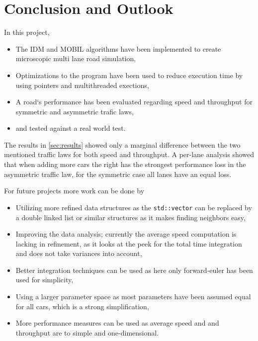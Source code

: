 \section{Conclusion and Outlook}
\label{sec:conclusion}
In this project, 
\begin{itemize}
  \item The IDM and MOBIL algorithms have been implemented to create microscopic multi lane road
    simulation,
  \item Optimizations to the program have been used to reduce execution time by using pointers and
    multithreaded exections,
  \item A road`s performance has been evaluated regarding speed and throughput for symmetric and
    asymmetric trafic laws,
  \item and tested against a real world test.
\end{itemize}
The results in \autoref{sec:results} showed only a marginal difference between the two mentioned
traffic laws for both speed and throughput. A per-lane analysis showed that when adding more cars
the right has the strongest performance loss in the asymmetric traffic law, for the symmetric case
all lanes have an equal loss.

For future projects more work can be done by
\begin{itemize}
  \item Utilizing more refined data structures as the \texttt{std::vector} can be replaced by a
    double linked list or similar structures as it makes finding neighbors easy,
  \item Improving the data analysis; currently the average speed computation is lacking in
    refinement, as it looks at the peek for the total time integration and does not take variances
    into account,
  \item Better integration techniques can be used as here only forward-euler has been used for
    simplicity,
  \item Using a larger parameter space as most parameters have been assumed equal for
    all cars, which is a strong simplification,
  \item More performance measures can be used as average speed and and throughput are to simple and
    one-dimensional.
\end{itemize}

